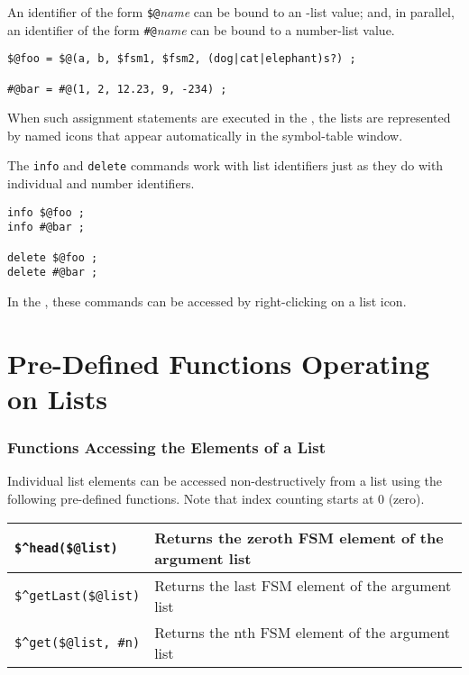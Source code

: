 \noindent
An identifier of the form \verb!$@!\emph{name} can be bound to an
\fsm{}-list value; and, in parallel, an identifier of the form
\verb!#@!\emph{name} can be bound to a number-list value.

\begin{Verbatim}
$@foo = $@(a, b, $fsm1, $fsm2, (dog|cat|elephant)s?) ;

#@bar = #@(1, 2, 12.23, 9, -234) ;
\end{Verbatim}

\noindent
When such assignment statements are executed in the , the lists are
represented by named icons that appear automatically in the symbol-table window.

The \texttt{info} and \texttt{delete} commands work with list identifiers
just as they do with individual \fsm{} and number identifiers.

\begin{Verbatim}
info $@foo ;
info #@bar ;

delete $@foo ;
delete #@bar ;
\end{Verbatim}

\noindent
In the , these commands can be accessed by right-clicking on a list
icon.

\section{Pre-Defined Functions Operating on Lists}

\subsubsection{Functions Accessing the Elements of a List} 
Individual list
elements can be accessed non-destructively from a list using the
following pre-defined functions.  Note that index counting starts at 0
(zero).

\vspace{.5cm}

\noindent
\begin{tabular}{|l|l|}
\hline
\verb!$^head($@list)! & Returns the zeroth FSM element of the argument list\\
\hline
\verb!$^getLast($@list)! & Returns the last FSM element of the argument list\\
\hline
\verb!$^get($@list, #n)! & Returns the nth FSM element of the argument list\\
\hline
\end{tabular}

